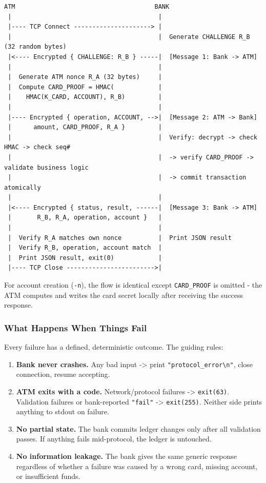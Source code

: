\documentclass[
]{article}
\providecommand{\tightlist}{%
  \setlength{\itemsep}{0pt}\setlength{\parskip}{0pt}}
\begin{document}
\begin{verbatim}
ATM                                      BANK
 |                                        |
 |---- TCP Connect ---------------------> |
 |                                        |  Generate CHALLENGE R_B (32 random bytes)
 |<---- Encrypted { CHALLENGE: R_B } -----|  [Message 1: Bank -> ATM]
 |                                        |
 |  Generate ATM nonce R_A (32 bytes)     |
 |  Compute CARD_PROOF = HMAC(            |
 |    HMAC(K_CARD, ACCOUNT), R_B)         |
 |                                        |
 |---- Encrypted { operation, ACCOUNT, -->|  [Message 2: ATM -> Bank]
 |      amount, CARD_PROOF, R_A }         |
 |                                        |  Verify: decrypt -> check HMAC -> check seq#
 |                                        |  -> verify CARD_PROOF -> validate business logic
 |                                        |  -> commit transaction atomically
 |                                        |
 |<---- Encrypted { status, result, ------|  [Message 3: Bank -> ATM]
 |       R_B, R_A, operation, account }   |
 |                                        |
 |  Verify R_A matches own nonce          |  Print JSON result
 |  Verify R_B, operation, account match  |
 |  Print JSON result, exit(0)            |
 |---- TCP Close ------------------------>|
\end{verbatim}

For account creation (\texttt{-n}), the flow is identical except
\texttt{CARD\_PROOF} is omitted - the ATM computes and writes the card
secret locally after receiving the success response.

\hypertarget{what-happens-when-things-fail}{%
\subsubsection{What Happens When Things
Fail}\label{what-happens-when-things-fail}}

Every failure has a defined, deterministic outcome. The guiding rules:

\begin{enumerate}
\def\labelenumi{\arabic{enumi}.}
\tightlist
\item
  \textbf{Bank never crashes.} Any bad input -\textgreater{} print
  \texttt{"protocol\_error\textbackslash{}n"}, close connection, resume
  accepting.
\item
  \textbf{ATM exits with a code.} Network/protocol failures
  -\textgreater{} \texttt{exit(63)}. Validation failures or
  bank-reported \texttt{"fail"} -\textgreater{} \texttt{exit(255)}.
  Neither side prints anything to stdout on failure.
\item
  \textbf{No partial state.} The bank commits ledger changes only after
  all validation passes. If anything fails mid-protocol, the ledger is
  untouched.
\item
  \textbf{No information leakage.} The bank gives the same generic
  response regardless of whether a failure was caused by a wrong card,
  missing account, or insufficient funds.
\end{enumerate}
\end{document}
